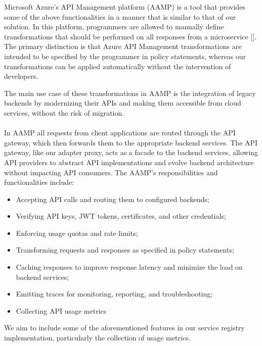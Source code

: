 Microsoft Azure's API Management platform (AAMP) is a tool that provides some of the above functionalities in a manner that is similar to that of our solution.
In this platform, programmers are allowed to manually define transformations that should be performed on all responses from a microservice [].
The primary distinction is that Azure API Management transformations are intended to be specified by the programmer in policy statements,
whereas our transformations can be applied automatically without the intervention of developers.

The main use case of these transformations in AAMP is the integration of legacy backends by modernizing their APIs and making them accessible from cloud services, without the risk of migration.

\paragraph{}

In AAMP all requests from client applications are routed through the API gateway, which then forwards them to the appropriate backend services.
The API gateway, like our adapter proxy, acts as a facade to the backend services,
allowing API providers to abstract API implementations and evolve backend architecture without impacting API consumers.
The AAMP's responsibilities and functionalities include:

\begin{itemize}
    \item Accepting API calls and routing them to configured backends;
    \item Verifying API keys, JWT tokens, certificates, and other credentials;
    \item Enforcing usage quotas and rate limits;
    \item Transforming requests and responses as specified in policy statements;
    \item Caching responses to improve response latency and minimize the load on backend services;
    \item Emitting traces for monitoring, reporting, and troubleshooting;
    \item Collecting API usage metrics
\end{itemize}


We aim to include some of the aforementioned features in our service registry implementation, particularly the collection of usage metrics.

